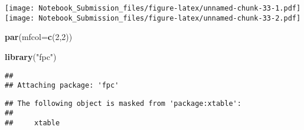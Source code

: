 \documentclass[
]{article}
\newenvironment{Shaded}{\begin{snugshade}}{\end{snugshade}}
\newcommand{\DataTypeTok}[1]{\textcolor[rgb]{0.13,0.29,0.53}{#1}}
\newcommand{\DecValTok}[1]{\textcolor[rgb]{0.00,0.00,0.81}{#1}}
\newcommand{\KeywordTok}[1]{\textcolor[rgb]{0.13,0.29,0.53}{\textbf{#1}}}
\newcommand{\NormalTok}[1]{#1}
\newcommand{\StringTok}[1]{\textcolor[rgb]{0.31,0.60,0.02}{#1}}
\begin{document}
\texttt{[image: Notebook\_Submission\_files/figure-latex/unnamed-chunk-33-1.pdf]}
\texttt{[image: Notebook\_Submission\_files/figure-latex/unnamed-chunk-33-2.pdf]}

\begin{Shaded}
\begin{Highlighting}[]
\KeywordTok{par}\NormalTok{(}\DataTypeTok{mfcol=}\KeywordTok{c}\NormalTok{(}\DecValTok{2}\NormalTok{,}\DecValTok{2}\NormalTok{))}

\KeywordTok{library}\NormalTok{(}\StringTok{"fpc"}\NormalTok{)}
\end{Highlighting}
\end{Shaded}

\begin{verbatim}
## 
## Attaching package: 'fpc'
\end{verbatim}

\begin{verbatim}
## The following object is masked from 'package:xtable':
## 
##     xtable
\end{verbatim}
\end{document}
